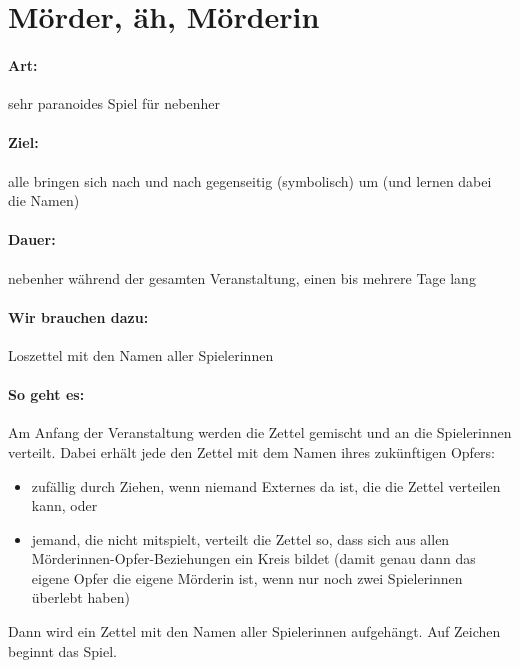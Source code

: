 \section{Mörder, äh, Mörderin}
\paragraph{Art:} sehr paranoides Spiel für nebenher
\paragraph{Ziel:} alle bringen sich nach und nach gegenseitig (symbolisch) um (und lernen dabei die Namen)
\paragraph{Dauer:} nebenher während der gesamten Veranstaltung, einen bis mehrere Tage lang
\paragraph{Wir brauchen dazu:} Loszettel mit den Namen aller Spielerinnen
\paragraph{So geht es:} Am Anfang der Veranstaltung werden die Zettel gemischt und an die Spielerinnen verteilt. Dabei erhält jede den Zettel mit dem Namen ihres zukünftigen Opfers:
	\begin{itemize}
		\item zufällig durch Ziehen, wenn niemand Externes da ist, die die Zettel verteilen kann, oder
		\item jemand, die nicht mitspielt, verteilt die Zettel so, dass sich aus allen Mörderinnen-Opfer-Beziehungen ein Kreis bildet (damit genau dann das eigene Opfer die eigene Mörderin ist, wenn nur noch zwei Spielerinnen überlebt haben)
	\end{itemize}
Dann wird ein Zettel mit den Namen aller Spielerinnen aufgehängt. Auf Zeichen beginnt das Spiel.

